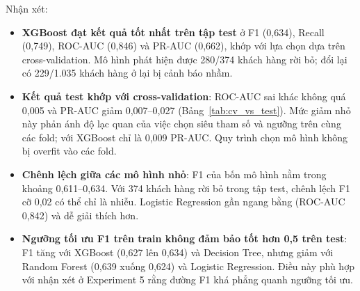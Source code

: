 \begin{table}[H]
\centering
\small
{}
\caption{So sánh cross-validation và tập test (cùng ngưỡng)}
\label{tab:cv_vs_test}
\end{table}

Nhận xét:
\begin{itemize}
    \item \textbf{XGBoost đạt kết quả tốt nhất trên tập test} ở F1 (0,634), Recall (0,749), ROC-AUC (0,846) và PR-AUC (0,662), khớp với lựa chọn dựa trên cross-validation. Mô hình phát hiện được 280/374 khách hàng rời bỏ; đổi lại có 229/1.035 khách hàng ở lại bị cảnh báo nhầm.
    \item \textbf{Kết quả test khớp với cross-validation}: ROC-AUC sai khác không quá 0,005 và PR-AUC giảm 0,007--0,027 (Bảng~\ref{tab:cv_vs_test}). Mức giảm nhỏ này phản ánh độ lạc quan của việc chọn siêu tham số và ngưỡng trên cùng các fold; với XGBoost chỉ là 0,009 PR-AUC. Quy trình chọn mô hình không bị overfit vào các fold.
    \item \textbf{Chênh lệch giữa các mô hình nhỏ}: F1 của bốn mô hình nằm trong khoảng 0,611--0,634. Với 374 khách hàng rời bỏ trong tập test, chênh lệch F1 cỡ 0,02 có thể chỉ là nhiễu. Logistic Regression gần ngang bằng (ROC-AUC 0,842) và dễ giải thích hơn.
    \item \textbf{Ngưỡng tối ưu F1 trên train không đảm bảo tốt hơn 0,5 trên test}: F1 tăng với XGBoost (0,627 lên 0,634) và Decision Tree, nhưng giảm với Random Forest (0,639 xuống 0,624) và Logistic Regression. Điều này phù hợp với nhận xét ở Experiment 5 rằng đường F1 khá phẳng quanh ngưỡng tối ưu.
\end{itemize}

